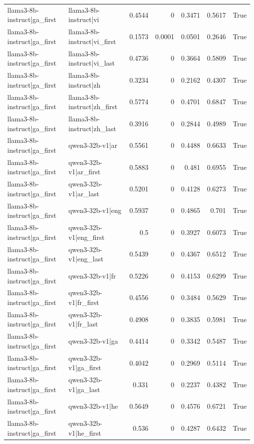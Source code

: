 \begin{table}
\begin{tabular}{l l r r r r l}
llama3-8b-instruct|ga_first & llama3-8b-instruct|vi & 0.4544 & 0 & 0.3471 & 0.5617 & True \\
llama3-8b-instruct|ga_first & llama3-8b-instruct|vi_first & 0.1573 & 0.0001 & 0.0501 & 0.2646 & True \\
llama3-8b-instruct|ga_first & llama3-8b-instruct|vi_last & 0.4736 & 0 & 0.3664 & 0.5809 & True \\
llama3-8b-instruct|ga_first & llama3-8b-instruct|zh & 0.3234 & 0 & 0.2162 & 0.4307 & True \\
llama3-8b-instruct|ga_first & llama3-8b-instruct|zh_first & 0.5774 & 0 & 0.4701 & 0.6847 & True \\
llama3-8b-instruct|ga_first & llama3-8b-instruct|zh_last & 0.3916 & 0 & 0.2844 & 0.4989 & True \\
llama3-8b-instruct|ga_first & qwen3-32b-v1|ar & 0.5561 & 0 & 0.4488 & 0.6633 & True \\
llama3-8b-instruct|ga_first & qwen3-32b-v1|ar_first & 0.5883 & 0 & 0.481 & 0.6955 & True \\
llama3-8b-instruct|ga_first & qwen3-32b-v1|ar_last & 0.5201 & 0 & 0.4128 & 0.6273 & True \\
llama3-8b-instruct|ga_first & qwen3-32b-v1|eng & 0.5937 & 0 & 0.4865 & 0.701 & True \\
llama3-8b-instruct|ga_first & qwen3-32b-v1|eng_first & 0.5 & 0 & 0.3927 & 0.6073 & True \\
llama3-8b-instruct|ga_first & qwen3-32b-v1|eng_last & 0.5439 & 0 & 0.4367 & 0.6512 & True \\
llama3-8b-instruct|ga_first & qwen3-32b-v1|fr & 0.5226 & 0 & 0.4153 & 0.6299 & True \\
llama3-8b-instruct|ga_first & qwen3-32b-v1|fr_first & 0.4556 & 0 & 0.3484 & 0.5629 & True \\
llama3-8b-instruct|ga_first & qwen3-32b-v1|fr_last & 0.4908 & 0 & 0.3835 & 0.5981 & True \\
llama3-8b-instruct|ga_first & qwen3-32b-v1|ga & 0.4414 & 0 & 0.3342 & 0.5487 & True \\
llama3-8b-instruct|ga_first & qwen3-32b-v1|ga_first & 0.4042 & 0 & 0.2969 & 0.5114 & True \\
llama3-8b-instruct|ga_first & qwen3-32b-v1|ga_last & 0.331 & 0 & 0.2237 & 0.4382 & True \\
llama3-8b-instruct|ga_first & qwen3-32b-v1|he & 0.5649 & 0 & 0.4576 & 0.6721 & True \\
llama3-8b-instruct|ga_first & qwen3-32b-v1|he_first & 0.536 & 0 & 0.4287 & 0.6432 & True \\

\end{tabular}
\end{table}
